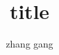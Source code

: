 \documentclass{beamer}
\begin{document}
\title{title}
\author{zhang gang}

\maketitle
\end{document}
